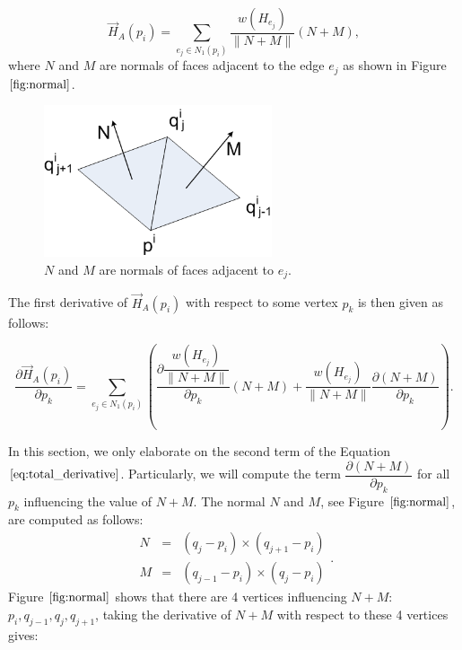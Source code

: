 \documentclass[11pt]{article}
\begin{document}
\begin{appendices}
\begin{equation}
\vec{H}_A(p_i) = \sum\limits_{e_j \in N_1(p_i)}\dfrac{w(H_{e_j})}{\parallel N+M \parallel}(N + M),
\end{equation}
where $N$ and $M$ are normals of faces adjacent to the edge $e_j$ as shown in Figure $\ref{fig:normal}$.
\begin{figure}[htbp]
\centering
\includegraphics[width=0.6\textwidth]{edge_normal.png}
\caption{$N$ and $M$ are normals of faces adjacent to $e_j$.}
\label{fig:normal}
\end{figure}
The first derivative of $\vec{H}_A(p_i)$ with respect to some vertex $p_k$ is then given as follows:

\begin{equation}
\dfrac{\partial \vec{H}_A(p_i)}{\partial p_k} = \sum\limits_{e_j \in N_1(p_i)} \left( \dfrac{\partial \dfrac{w(H_{e_j})}{\parallel N+M \parallel}}{\partial p_k}(N+M) + \dfrac{w(H_{e_j})}{\parallel N+M \parallel} \dfrac{\partial (N+M)}{\partial p_k} \right) .
\label{eq:total_derivative}
\end{equation}

In this section, we only elaborate on the second term of the Equation $\ref{eq:total_derivative}$. Particularly, we will compute the term $\dfrac{\partial (N+M)}{\partial p_k}$ for all $p_k$ influencing the value of $N+M$. The normal $N$ and $M$, see Figure $\ref{fig:normal}$, are computed as follows:
\begin{equation}
\begin{array}{rcl} 
N & = & (q_j - p_i) \times (q_{j+1} - p_i) \\ 
M & = & (q_{j-1} - p_i) \times (q_j - p_i) 
\end{array} .
\end{equation}
Figure $\ref{fig:normal}$ shows that there are 4 vertices influencing $N+M$: $p_i, q_{j-1}, q_j, q_{j+1}$, taking the derivative of $N+M$ with respect to these 4 vertices gives:


\end{appendices}
\end{document}
